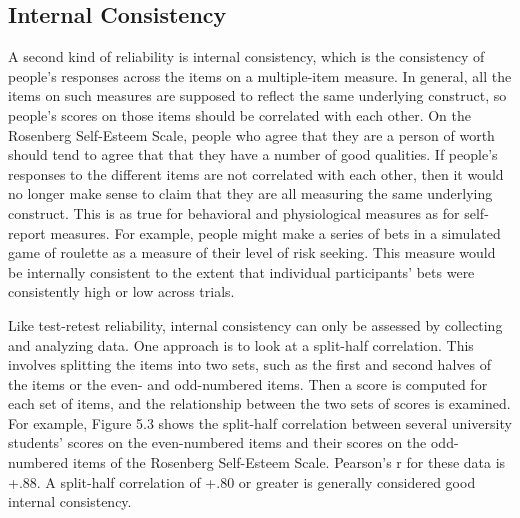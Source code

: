 \subsection{Internal Consistency}


A second kind of reliability is internal consistency, which is the consistency of people's responses across the items on a multiple-item measure. In general, all the items on such measures are supposed to reflect the same underlying construct, so people's scores on those items should be correlated with each other. On the Rosenberg Self-Esteem Scale, people who agree that they are a person of worth should tend to agree that that they have a number of good qualities. If people's responses to the different items are not correlated with each other, then it would no longer make sense to claim that they are all measuring the same underlying construct. This is as true for behavioral and physiological measures as for self-report measures. For example, people might make a series of bets in a simulated game of roulette as a measure of their level of risk seeking. This measure would be internally consistent to the extent that individual participants' bets were consistently high or low across trials.


Like test-retest reliability, internal consistency can only be assessed by collecting and analyzing data. One approach is to look at a split-half correlation. This involves splitting the items into two sets, such as the first and second halves of the items or the even- and odd-numbered items. Then a score is computed for each set of items, and the relationship between the two sets of scores is examined. For example, Figure 5.3 shows the split-half correlation between several university students' scores on the even-numbered items and their scores on the odd-numbered items of the Rosenberg Self-Esteem Scale. Pearson's r for these data is +.88. A split-half correlation of +.80 or greater is generally considered good internal consistency.




